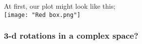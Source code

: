 %
%

\begin{frame}

At first, our plot might look like this;\\

\texttt{[image: "Red box.png"]}

\end{frame}


%
%

\begin{frame}
\frametitle{3-d rotations in a complex space?}

\end{frame}

